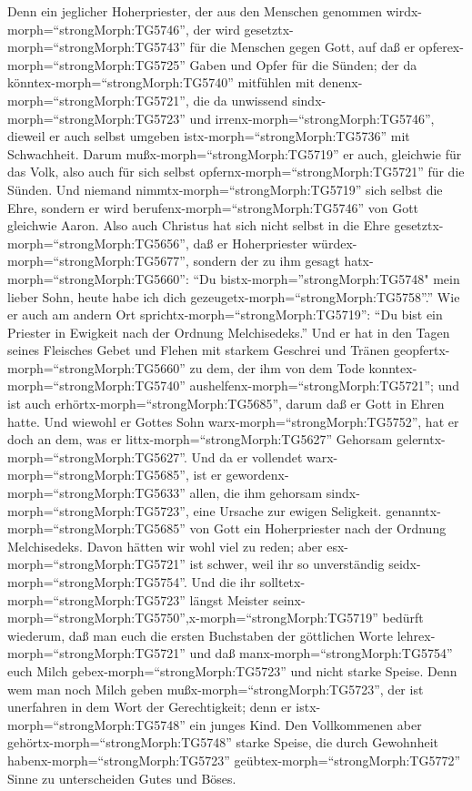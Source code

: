  Denn ein jeglicher Hoherpriester, der aus den Menschen
genommen wirdx-morph=``strongMorph:TG5746'', der wird
gesetztx-morph=``strongMorph:TG5743'' für die Menschen gegen Gott, auf
daß er opferex-morph=``strongMorph:TG5725'' Gaben und Opfer für die
Sünden;  der da könntex-morph=``strongMorph:TG5740''
mitfühlen mit denenx-morph=``strongMorph:TG5721'', die da unwissend
sindx-morph=``strongMorph:TG5723'' und
irrenx-morph=``strongMorph:TG5746'', dieweil er auch selbst umgeben
istx-morph=``strongMorph:TG5736'' mit Schwachheit.  Darum
mußx-morph=``strongMorph:TG5719'' er auch, gleichwie für das Volk, also
auch für sich selbst opfernx-morph=``strongMorph:TG5721'' für die
Sünden.  Und niemand nimmtx-morph=``strongMorph:TG5719''
sich selbst die Ehre, sondern er wird
berufenx-morph=``strongMorph:TG5746'' von Gott gleichwie Aaron.
 Also auch Christus hat sich nicht selbst in die Ehre
gesetztx-morph=``strongMorph:TG5656'', daß er Hoherpriester
würdex-morph=``strongMorph:TG5677'', sondern der zu ihm gesagt
hatx-morph=``strongMorph:TG5660'': ``Du
bistx-morph=''strongMorph:TG5748" mein lieber Sohn, heute habe ich dich
gezeugetx-morph=``strongMorph:TG5758''.''  Wie er auch am
andern Ort sprichtx-morph=``strongMorph:TG5719'': ``Du bist ein Priester
in Ewigkeit nach der Ordnung Melchisedeks.''  Und er hat in
den Tagen seines Fleisches Gebet und Flehen mit starkem Geschrei und
Tränen geopfertx-morph=``strongMorph:TG5660'' zu dem, der ihm von dem
Tode konntex-morph=``strongMorph:TG5740''
aushelfenx-morph=``strongMorph:TG5721''; und ist auch
erhörtx-morph=``strongMorph:TG5685'', darum daß er Gott in Ehren hatte.
 Und wiewohl er Gottes Sohn
warx-morph=``strongMorph:TG5752'', hat er doch an dem, was er
littx-morph=``strongMorph:TG5627'' Gehorsam
gelerntx-morph=``strongMorph:TG5627''.  Und da er vollendet
warx-morph=``strongMorph:TG5685'', ist er
gewordenx-morph=``strongMorph:TG5633'' allen, die ihm gehorsam
sindx-morph=``strongMorph:TG5723'', eine Ursache zur ewigen Seligkeit.
 genanntx-morph=``strongMorph:TG5685'' von Gott ein
Hoherpriester nach der Ordnung Melchisedeks.  Davon hätten
wir wohl viel zu reden; aber esx-morph=``strongMorph:TG5721'' ist
schwer, weil ihr so unverständig seidx-morph=``strongMorph:TG5754''.
 Und die ihr solltetx-morph=``strongMorph:TG5723'' längst
Meister
seinx-morph=``strongMorph:TG5750'',x-morph=``strongMorph:TG5719''
bedürft wiederum, daß man euch die ersten Buchstaben der göttlichen
Worte lehrex-morph=``strongMorph:TG5721'' und daß
manx-morph=``strongMorph:TG5754'' euch Milch
gebex-morph=``strongMorph:TG5723'' und nicht starke Speise.
 Denn wem man noch Milch geben
mußx-morph=``strongMorph:TG5723'', der ist unerfahren in dem Wort der
Gerechtigkeit; denn er istx-morph=``strongMorph:TG5748'' ein junges
Kind.  Den Vollkommenen aber
gehörtx-morph=``strongMorph:TG5748'' starke Speise, die durch Gewohnheit
habenx-morph=``strongMorph:TG5723'' geübtex-morph=``strongMorph:TG5772''
Sinne zu unterscheiden Gutes und Böses.

